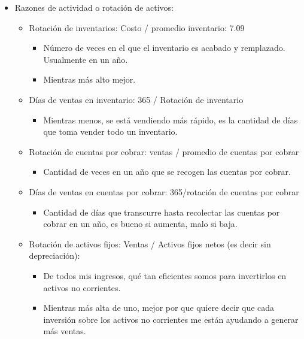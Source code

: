\documentclass{article}
\begin{document}
\begin{itemize}
    \item Razones de actividad o rotación de activos:
        \begin{itemize}
            \item Rotación de inventarios: Costo / promedio inventario: 7.09
                \begin{itemize}
                    \item Número de veces en el que el inventario es acabado y remplazado. Usualmente en un año.
                    \item Mientras más alto mejor. 
                \end{itemize}

            \item Días de ventas en inventario: 365 / Rotación de inventario 
                \begin{itemize}
                    \item Mientras menos, se está vendiendo más rápido, es la cantidad de días que toma vender todo un inventario. 
                \end{itemize}
                
            \item Rotación de cuentas por cobrar: ventas / promedio de cuentas por cobrar 
                \begin{itemize}
                    \item Cantidad de veces en un año que se recogen las cuentas por cobrar. 
                \end{itemize}
                
            \item Días de ventas en cuentas por cobrar: 365/rotación de cuentas por cobrar 
                \begin{itemize}
                    \item Cantidad de días que transcurre hasta recolectar las cuentas por cobrar en un año, es bueno si aumenta, malo si baja. 
                \end{itemize}
                
            \item Rotación de activos fijos: Ventas / Activos fijos netos (es decir sin depreciación): 
                \begin{itemize}
                    \item De todos mis ingresos, qué tan eficientes somos para invertirlos en activos no corrientes. 
                    \item Mientras más alta de uno, mejor por que quiere decir que cada inversión sobre los activos no corrientes me están ayudando a generar más ventas. 
                \end{itemize}
                

\end{itemize}
\end{itemize}
\end{document}

